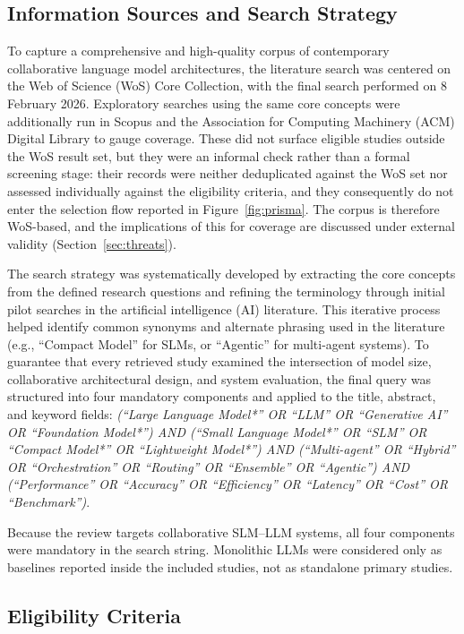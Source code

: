 \subsection{Information Sources and Search Strategy}
\label{sec:search_strategy}

To capture a comprehensive and high-quality corpus of contemporary collaborative language model architectures, the literature search was centered on the Web of Science (WoS) Core Collection, with the final search performed on 8 February 2026. Exploratory searches using the same core concepts were additionally run in Scopus and the Association for Computing Machinery (ACM) Digital Library to gauge coverage. These did not surface eligible studies outside the WoS result set, but they were an informal check rather than a formal screening stage: their records were neither deduplicated against the WoS set nor assessed individually against the eligibility criteria, and they consequently do not enter the selection flow reported in Figure~\ref{fig:prisma}. The corpus is therefore WoS-based, and the implications of this for coverage are discussed under external validity (Section~\ref{sec:threats}).

The search strategy was systematically developed by extracting the core concepts from the defined research questions and refining the terminology through initial pilot searches in the artificial intelligence (AI) literature. This iterative process helped identify common synonyms and alternate phrasing used in the literature (e.g., ``Compact Model'' for SLMs, or ``Agentic'' for multi-agent systems). To guarantee that every retrieved study examined the intersection of model size, collaborative architectural design, and system evaluation, the final query was structured into four mandatory components and applied to the title, abstract, and keyword fields: \textit{(``Large Language Model*'' OR ``LLM'' OR ``Generative AI'' OR ``Foundation Model*'') AND (``Small Language Model*'' OR ``SLM'' OR ``Compact Model*'' OR ``Lightweight Model*'') AND (``Multi-agent'' OR ``Hybrid'' OR ``Orchestration'' OR ``Routing'' OR ``Ensemble'' OR ``Agentic'') AND (``Performance'' OR ``Accuracy'' OR ``Efficiency'' OR ``Latency'' OR ``Cost'' OR ``Benchmark'')}.

Because the review targets collaborative SLM--LLM systems, all four components were mandatory in the search string. Monolithic LLMs were considered only as baselines reported inside the included studies, not as standalone primary studies.

\subsection{Eligibility Criteria}
\label{sec:eligibility_criteria}

